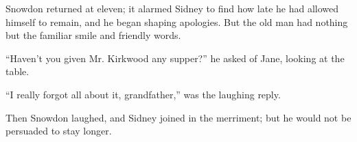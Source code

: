 Snowdon returned at eleven; it alarmed Sidney to find how late he had
allowed himself to remain, and he began shaping apologies. But the old
man had nothing but the familiar smile and friendly words.

``Haven't you given Mr. Kirkwood any supper?'' he asked of Jane, looking
at the table.

{}``I really forgot all about it, grandfather,'' was the laughing reply.

Then Snowdon laughed, and Sidney joined in the merriment; but he would
not be persuaded to stay longer.
